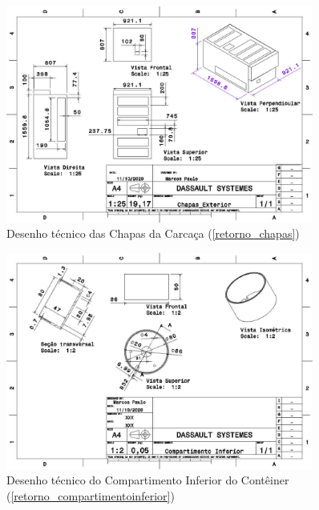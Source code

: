 \begin{apendicesenv}
\begin{figure}[H]
    \centering
    \includegraphics[width=0.9\textwidth]{figuras/estrutura/Desenhos/Chapas_Exterior.jpg}
    \caption{Desenho técnico das Chapas da Carcaça (\ref{retorno_chapas})}
    \label{fig:chapasexterior}
\end{figure}

\begin{figure}[H]
    \centering
    \includegraphics[width=0.9\textwidth]{figuras/estrutura/Desenhos/Compartimento_Inferior.jpg}
    \caption{Desenho técnico do Compartimento Inferior do Contêiner (\ref{retorno_compartimentoinferior})}
    \label{fig:compartimentoinferior}
\end{figure}


\end{apendicesenv}
